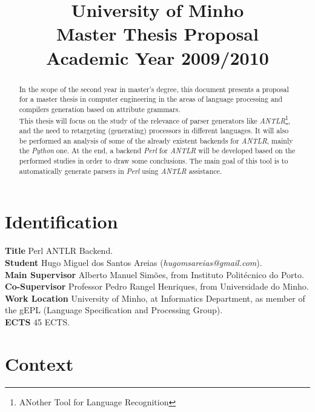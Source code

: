 \documentclass[a4paper,12pt]{article}
\title{\huge \bigskip
{\LARGE University of Minho}\\[13pt]
{\large Master Thesis Proposal}\\[13pt]
{\large Academic Year 2009/2010}
}\author{}\date{}
\begin{document}
\maketitle
{}

\section*{\Large Identification}
\textbf{Title} Perl ANTLR Backend.\\[6pt]
\textbf{Student} Hugo Miguel dos Santos Areias (\emph{hugomsareias@gmail.com}).\\[6pt]
\textbf{Main Supervisor} Alberto Manuel Simões, from Instituto Politécnico do Porto.\\[6pt]
\textbf{Co-Supervisor} Professor Pedro Rangel Henriques, from Universidade do Minho.\\[6pt]
\textbf{Work Location} University of Minho, at Informatics Department, as member of the gEPL (Language Specification and Processing Group).\\[6pt]
\textbf{ECTS} 45 ECTS.\\[12pt]

\begin{abstract}
In the scope of the second year in master's degree, this document presents a proposal for a master thesis in computer engineering in the areas of language processing and compilers generation based on attribute grammars.\\[6pt]
This thesis will focus on the study of the relevance of parser generators like \emph{ANTLR}\footnote[1]{ANother Tool for Language Recognition}, and the need to retargeting (generating) processors in different languages. It will also be performed an analysis of some of the already existent backends for \emph{ANTLR}, mainly the \emph{Python} one. At the end, a backend \emph{Perl} for \emph{ANTLR} will be developed based on the performed studies in order to draw some conclusions. The main goal of this tool is to automatically generate parsers in \emph{Perl} using \emph{ANTLR} assistance. 
\end{abstract}

\newpage

\section{\Large Context}
\end{document}
